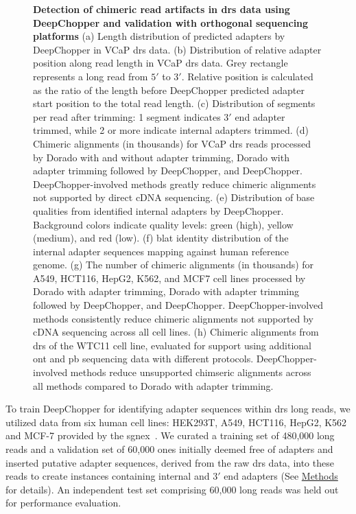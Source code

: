 \documentclass[pdflatex,sn-nature, lineno]{sn-jnl}%
\begin{document}
\begin{figure}[!ht]
	\caption{{\bf Detection of chimeric read artifacts in \gls{drs} data using DeepChopper and validation with orthogonal sequencing platforms}  (a) Length distribution of predicted adapters by DeepChopper in VCaP \gls{drs} data. (b) Distribution of relative adapter position along read length in VCaP \gls{drs} data. Grey rectangle represents a long read from $5'$ to $3'$. Relative position is calculated as the ratio of the length before DeepChopper predicted adapter start position to the total read length. (c) Distribution of segments per read after trimming: 1 segment indicates $3'$ end adapter trimmed, while 2 or more indicate internal adapters trimmed. (d) Chimeric alignments (in thousands) for VCaP \gls{drs} reads processed by Dorado with and without adapter trimming, Dorado with adapter trimming followed by DeepChopper, and DeepChopper. DeepChopper-involved methods greatly reduce chimeric alignments not supported by direct cDNA sequencing. (e) Distribution of base qualities from identified internal adapters by DeepChopper. Background colors indicate quality levels: green (high), yellow (medium), and red (low). (f) \gls{blat} identity distribution of the internal adapter sequences mapping against human reference genome. (g) The number of chimeric alignments (in thousands) for A549, HCT116, HepG2, K562, and MCF7 cell lines processed by Dorado with adapter trimming, Dorado with adapter trimming followed by DeepChopper, and DeepChopper. DeepChopper-involved methods consistently reduce chimeric alignments not supported by cDNA sequencing across all cell lines. (h) Chimeric alignments from \gls{drs} of the WTC11 cell line, evaluated for support using additional \gls{ont} and \gls{pb} sequencing data with different protocols. DeepChopper-involved methods reduce unsupported chimseric alignments across all methods compared to Dorado with adapter trimming.}\label{fig:f2}
\end{figure}


To train DeepChopper for identifying adapter sequences within \gls{drs} long reads, we utilized data from six human cell lines: HEK293T, A549, HCT116, HepG2, K562 and MCF-7 provided by the \gls{sgnex}~\cite{chen2021systematic}.
We curated a training set of 480,000 long reads and a validation set of 60,000 ones initially deemed free of adapters and inserted putative adapter sequences, derived from the raw \gls{drs} data, into these reads to create instances containing internal and $3'$ end adapters (See \hyperref[sec:methods]{Methods} for details).
An independent test set comprising 60,000 long reads was held out for performance evaluation.
\end{document}

